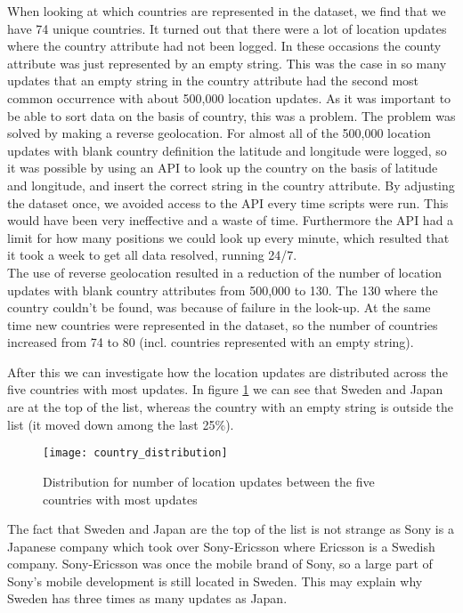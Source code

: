 When looking at which countries are represented in the dataset, we find that we have 74 unique countries. It turned out that there were a lot of location updates where the country attribute had not been logged. In these occasions the county attribute was just represented by an empty string. This was the case in so many updates that an empty string in the country attribute had the second most common occurrence with about 500,000 location updates. 
As it was important to be able to sort data on the basis of country, this was a problem. The problem was solved by making a reverse geolocation. For almost all of the 500,000 location updates with blank country definition the latitude and longitude were logged, so it was possible by using an API\cite{reversegeocode} to look up the country on the basis of latitude and longitude, and insert the correct string in the country attribute. By adjusting the dataset once, we avoided access to the API every time scripts were run. This would have been very ineffective and a waste of time. Furthermore the API had a limit for how many positions we could look up every minute, which resulted that it took a week to get all data resolved, running 24/7.  \\ 
The use of reverse geolocation resulted in a reduction of the number of location updates with blank country attributes from 500,000 to 130. The 130 where the country couldn't be found, was because of failure in the look-up. At the same time new countries were represented in the dataset, so the number of countries increased from 74 to 80 (incl. countries represented with an empty string).


After this we can investigate how the location updates are distributed across the five countries with most updates. In figure \ref{fig:country_dist} we can see that Sweden and Japan are at the top of the list, whereas the country with an empty string is outside the list (it moved down among the last 25\%). 


\begin{figure}[H]
    \hspace*{-1.0cm}
    \centering
    \texttt{[image: country\_distribution]}
    \caption{Distribution for number of location updates between the five countries with most updates}
    \label{fig:country_dist}
\end{figure}


The fact that Sweden and Japan are the top of the list is not strange as Sony is a Japanese company which took over Sony-Ericsson where Ericsson is a Swedish company. Sony-Ericsson was once the mobile brand of Sony, so a large part of Sony's mobile development is still located in Sweden. This may explain why Sweden has three times as many updates as Japan.  

